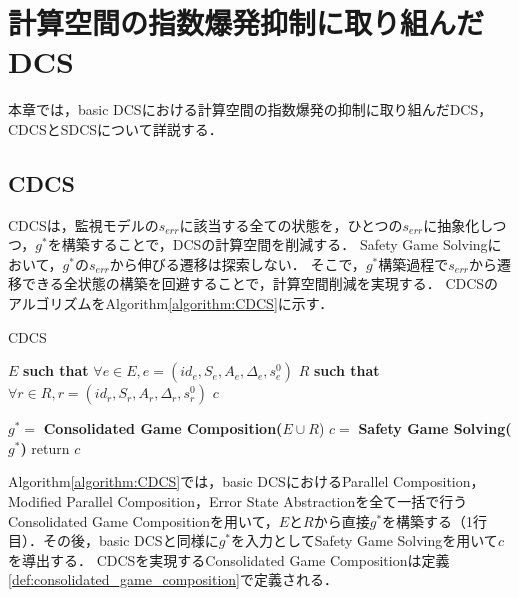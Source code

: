 \section{計算空間の指数爆発抑制に取り組んだDCS}
\label{section:advDCS}
本章では，basic DCSにおける計算空間の指数爆発の抑制に取り組んだDCS，CDCSとSDCSについて詳説する．


\subsection{CDCS}
\label{subsection:CDCS}
CDCS\cite{yamauchi:IPSJ2024}は，監視モデルの$s_{err}$に該当する全ての状態を，ひとつの$s_{err}$に抽象化しつつ，$g^*$を構築することで，DCSの計算空間を削減する．
Safety Game Solvingにおいて，$g^*$の$s_{err}$から伸びる遷移は探索しない．
そこで，$g^*$構築過程で$s_{err}$から遷移できる全状態の構築を回避することで，計算空間削減を実現する．
CDCSのアルゴリズムをAlgorithm\ref{algorithm:CDCS}に示す．

\begin{algorithm}[h]
\caption{CDCS}
\label{algorithm:CDCS}
\begin{algorithmic}[1]
\renewcommand{\algorithmicrequire}{\textbf{Input:}}
\renewcommand{\algorithmicensure}{\textbf{Output:}}
\REQUIRE $E$ {\bf such that} $\forall e \in E, e = (id_{e}, S_{e}, A_{e}, \Delta_{e}, s^0_{e})$
\REQUIRE $R$ {\bf such that} $\forall r \in R, r = (id_{r}, S_{r}, A_{r}, \Delta_{r}, s^0_{r})$
\ENSURE  $c$

\STATE $g^* =$ {\bf Consolidated Game Composition($E \cup R$})
\STATE $c   =$ {\bf Safety Game Solving($g^*$)}
\STATE return $c$
\end{algorithmic}
\end{algorithm}

Algorithm\ref{algorithm:CDCS}では，basic DCSにおけるParallel Composition，Modified Parallel Composition，Error State Abstractionを全て一括で行うConsolidated Game Compositionを用いて，$E$と$R$から直接$g^*$を構築する（1行目）．その後，basic DCSと同様に$g^*$を入力としてSafety Game Solvingを用いて$c$を導出する．
CDCSを実現するConsolidated Game Compositionは定義\ref{def:consolidated_game_composition}で定義される．

